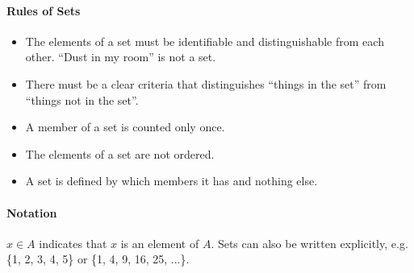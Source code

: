 \documentclass{article}
\begin{document}
\paragraph{Rules of Sets}
\begin{itemize}
\item The elements of a set must be identifiable and distinguishable from each other. ``Dust in my room'' is not a set.
\item There must be a clear criteria that distinguishes ``things in the set'' from ``things not in the set''.
\item A member of a set is counted only once.
\item The elements of a set are not ordered.
\item A set is defined by which members it has and nothing else.
\end{itemize}

\paragraph{Notation} $x\in A$ indicates that $x$ is an element of $A$. Sets can also be written explicitly, e.g. \{1, 2, 3, 4, 5\} or \{1, 4, 9, 16, 25, ...\}.
\end{document}
